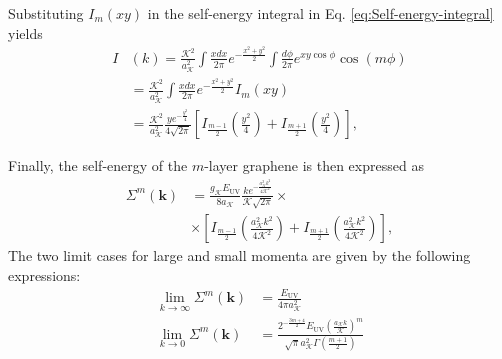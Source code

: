 \documentclass[english,aps,prd,nofootinbib,twocolumn]{revtex4-1}
\begin{document}
Substituting $I_{m}(xy)$ in the self-energy integral in Eq. \eqref{eq:Self-energy-integral} yields
\begin{equation}
\begin{split}
I&(k) =
\frac{\mathcal{K}^{2}}{a_{\mathcal{K}}^{2}}\!\!
\int \!\! \frac{x dx}{2\pi}
e^{-\tfrac{x^{2}+y^{2}}{2} } \!\!
\int \!\! \frac{d\phi }{2\pi}
e^{xy \cos \!\phi} 
\! \cos(m\phi) 
\\ &=
\frac{\mathcal{K}^{2}}{a_{\mathcal{K}}^{2}}\!\!
\int \!\! \frac{x dx}{2\pi}
e^{-\tfrac{x^{2}+y^{2}}{2} } \! I_{m}(xy)
\\ &=
\frac{\mathcal{K}^{2}}{a_{\mathcal{K}}^{2}}
\frac{y e^{-\frac{y^{2}}{4}}}{4\sqrt{2\pi}}
\left[ 
I_{\frac{m-1}{2}}\left(\frac{y^{2}}{4}\right) + 
I_{\frac{m+1}{2}}\left(\frac{y^{2}}{4}\right)
\right]
,
\end{split}
\end{equation}

Finally, the self-energy of the $m$-layer graphene is then expressed as
\begin{equation}
\begin{split}
\Sigma^{m}(\mathbf{k })
\! &= \!
\frac{g_{\mathcal{K}}E_{\mathrm{UV}}}{8a_{\mathcal{K}}}
\frac{k e^{-\frac{a_{\mathcal{K}}^{2}k^{2}}{4\mathcal{K}^{2}}}}{\mathcal{K}\sqrt{2\pi}}
 \times \\ &\times
\left[ 
I_{\frac{m-1}{2}}\!\!
\left(\frac{a_{\mathcal{K}}^{2}k^{2}}{4\mathcal{K}^{2}}\right)
\!\! + \!
I_{\frac{m+1}{2}}\!\!
\left(\frac{a_{\mathcal{K}}^{2}k^{2}}{4\mathcal{K}^{2}}\right)
\!
\right]
\!
,
\end{split}
\end{equation}
The two limit cases for large and small momenta are given by the following expressions:
\begin{equation}
\begin{split}
\lim_{k\rightarrow \infty} \Sigma^{m}(\mathbf{k }) &=
\frac{E_{\mathrm{UV}}}{4\pi a_{\mathcal{K}}^{2}} \\
\lim_{k\rightarrow 0} \Sigma^{m}(\mathbf{k }) &=
\frac{2^{-\frac{3m\!+\!4}{2}} E_{\mathrm{UV}} \left(\frac{a_{\mathcal{K}} k}{\mathcal{K}}\right)^m}{\sqrt{\pi } a_{\mathcal{K}}^2 \Gamma \left(\frac{m+1}{2}\right)}
\end{split}
\end{equation}
\end{document}
